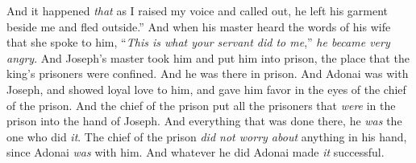 \begin{biblechapter}
\verse And it happened \textit{that} as I raised my voice and called out, he left his garment beside me and fled outside.”
\verse And when his master heard the words of his wife that she spoke to him, “\textit{This is what your servant did to me},” \textit{he became very angry}.
\verse And Joseph’s master took him and put him into prison, the place that the king’s prisoners were confined. And he was there in prison.
\verse And Adonai was with Joseph, and showed loyal love to him, and gave him favor in the eyes of the chief of the prison.
\verse And the chief of the prison put all the prisoners that \textit{were} in the prison into the hand of Joseph. And everything that was done there, he \textit{was} the one who did \textit{it}.
\verse The chief of the prison \textit{did not worry about} anything in his hand, since Adonai \textit{was} with him. And whatever he did Adonai made \textit{it} successful.
\end{biblechapter}

